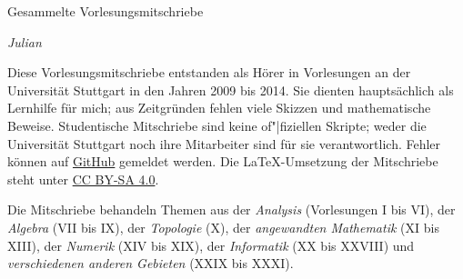 
\ihead{\leftmark}
\ifoot{\vspace{-1.5mm}\rightmark}

\thispagestyle{empty}
\vspace*{1em}

{%
  \huge%
  Gesammelte Vorlesungsmitschriebe%
}
\vspace*{1em}

\emph{Julian }

\vspace*{1em}

Diese Vorlesungsmitschriebe entstanden als Hörer in Vorlesungen
an der Universität Stuttgart in den Jahren 2009 bis 2014.
Sie dienten hauptsächlich als Lernhilfe für mich;
aus Zeitgründen fehlen viele Skizzen und mathematische Beweise.
Studentische Mitschriebe sind keine of"|fiziellen Skripte;
weder die Universität Stuttgart noch ihre Mitarbeiter sind für sie verantwortlich.
Fehler können auf \href{https://github.com/valentjn/class-notes}{GitHub} gemeldet werden.
Die \LaTeX{}-Umsetzung der Mitschriebe steht unter
\href{https://creativecommons.org/licenses/by-sa/4.0/}{CC BY-SA 4.0}.

Die Mitschriebe behandeln Themen aus
der \emph{Analysis} (Vorlesungen I bis VI),
der \emph{Algebra} (VII bis IX),
der \emph{Topologie} (X),
der \emph{angewandten Mathematik} (XI bis XIII),
der \emph{Numerik} (XIV bis XIX),
der \emph{Informatik} (XX bis XXVIII) und
\emph{verschiedenen anderen Gebieten} (XXIX bis XXXI).

{%
  \setcounter{tocdepth}{\parttocdepth}


  \makeatletter
  \renewcommand*{\@pnumwidth}{2.7em}
  \renewcommand*{\@tocrmarg}{2.7em}
  \makeatother

  \renewcommand*{\contentsname}{Vorlesungen}
  \tableofcontents%
}

\pagebreak

{%
  \manualmark{}


  \setcounter{tocdepth}{\subsubsectiontocdepth}

  \tableofcontents%
}

\pagebreak



